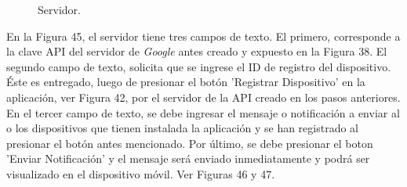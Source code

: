 \begin{figure}[H]
\centering
\setlength\fboxsep{0pt}
\setlength\fboxrule{0.5pt}
\caption{Servidor.}
\label{servidor}
\end{figure}

En la Figura 45, el servidor tiene tres campos de texto. El primero, corresponde a la clave API del servidor de \textit{Google} antes creado y expuesto en la Figura 38. El segundo campo de texto, solicita que se ingrese el ID de registro del dispositivo. Éste es entregado, luego de presionar el botón 'Registrar Dispositivo' en la aplicación, ver Figura 42, por el servidor de la API creado en los pasos anteriores. En el tercer campo de texto, se debe ingresar el mensaje o notificación a enviar al o los dispositivos que tienen instalada la aplicación y se han registrado al presionar el botón antes mencionado. Por último, se debe presionar el boton 'Enviar Notificación' y el mensaje será enviado inmediatamente y podrá ser visualizado en el dispositivo móvil. Ver Figuras 46 y 47.\\

